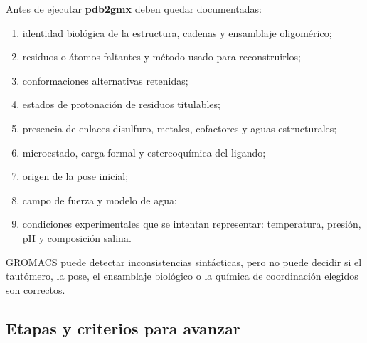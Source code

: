 \documentclass[
  spanish,
  11pt,
  a4paper]{article}
\providecommand{\tightlist}{%
  \setlength{\itemsep}{0pt}\setlength{\parskip}{0pt}}
\begin{document}
Antes de ejecutar \textbf{pdb2gmx} deben quedar documentadas:

\begin{enumerate}
\def\labelenumi{\arabic{enumi}.}
\tightlist
\item
  identidad biológica de la estructura, cadenas y ensamblaje
  oligomérico;
\item
  residuos o átomos faltantes y método usado para reconstruirlos;
\item
  conformaciones alternativas retenidas;
\item
  estados de protonación de residuos titulables;
\item
  presencia de enlaces disulfuro, metales, cofactores y aguas
  estructurales;
\item
  microestado, carga formal y estereoquímica del ligando;
\item
  origen de la pose inicial;
\item
  campo de fuerza y modelo de agua;
\item
  condiciones experimentales que se intentan representar: temperatura,
  presión, pH y composición salina.
\end{enumerate}

GROMACS puede detectar inconsistencias sintácticas, pero no puede
decidir si el tautómero, la pose, el ensamblaje biológico o la química
de coordinación elegidos son correctos.

\subsection{Etapas y criterios para
avanzar}\label{etapas-y-criterios-para-avanzar}
\end{document}
